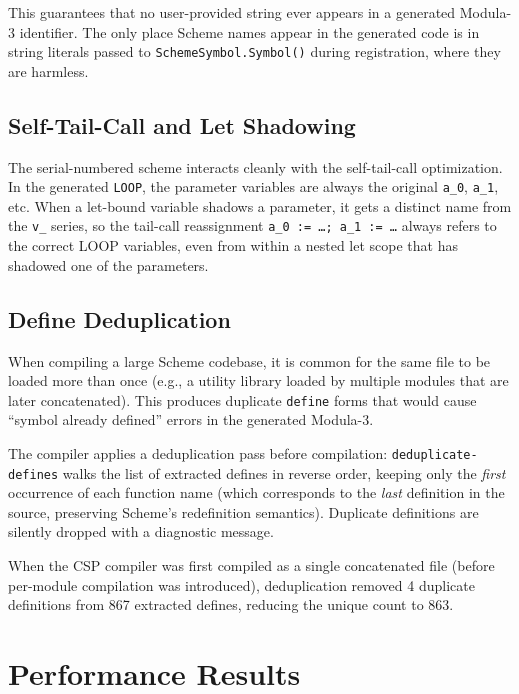 \documentclass[12pt]{report}
\begin{document}
This guarantees that no user-provided string ever appears in a
generated Modula-3 identifier.  The only place Scheme names appear
in the generated code is in string literals passed to
\texttt{SchemeSymbol.Symbol()} during registration, where they are
harmless.

\subsection{Self-Tail-Call and Let Shadowing}

The serial-numbered scheme interacts cleanly with the self-tail-call
optimization.  In the generated \texttt{LOOP}, the parameter variables
are always the original \texttt{a\_0}, \texttt{a\_1}, etc.  When a
let-bound variable shadows a parameter, it gets a distinct name from
the \texttt{v\_} series, so the tail-call reassignment
\texttt{a\_0~:=~\ldots;\ a\_1~:=~\ldots} always refers to the
correct LOOP variables, even from within a nested let scope that has
shadowed one of the parameters.

\subsection{Define Deduplication}
\label{sec:impl-dedup}

When compiling a large Scheme codebase, it is common for the same
file to be loaded more than once (e.g., a utility library loaded
by multiple modules that are later concatenated).  This produces
duplicate \texttt{define} forms that would cause ``symbol
already defined'' errors in the generated Modula-3.

The compiler applies a deduplication pass before compilation:
\texttt{deduplicate-defines} walks the list of extracted defines
in reverse order, keeping only the \emph{first} occurrence of each
function name (which corresponds to the \emph{last} definition in
the source, preserving Scheme's redefinition semantics).  Duplicate
definitions are silently dropped with a diagnostic message.

When the CSP compiler was first compiled as a single concatenated
file (before per-module compilation was introduced), deduplication
removed 4 duplicate definitions from 867 extracted defines,
reducing the unique count to 863.

\section{Performance Results}
\label{sec:impl-perf}
\end{document}
